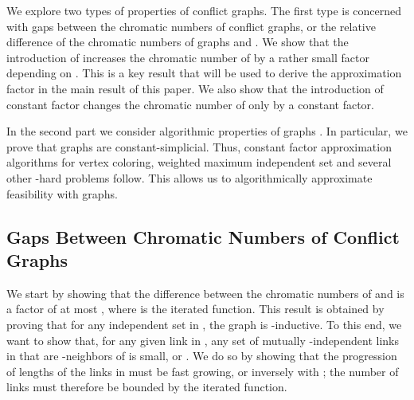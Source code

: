 \documentclass[11pt]{article}
\newcommand{\subsec}[1]{\subsection{#1}}
\begin{document}
We explore two types of properties of conflict graphs. The first type is concerned with gaps between the chromatic numbers of conflict graphs, or the relative difference of the chromatic numbers of graphs  and .
We show that the introduction of  increases the chromatic number of  by a rather small factor depending on . This is a key result that will be used to derive the approximation factor in the main result of this paper. 
We also show that the introduction of constant factor  changes the chromatic number of  only by a constant factor.

 In the second part we consider algorithmic properties of graphs . In particular, we prove that graphs  are constant-simplicial. Thus, constant factor approximation algorithms for vertex coloring, weighted maximum independent set and several other -hard problems follow. This allows us to algorithmically approximate feasibility with graphs.


\subsec{Gaps Between Chromatic Numbers of Conflict Graphs}\label{S:gaps}
We start by  showing that the difference between the chromatic numbers of  and  is a factor of at most , where  is the iterated  function. This result is obtained by proving that for any independent set  in , the graph  is -inductive. 
To this end, we want to show that, for any given link  in , any set  of mutually -independent links in
  that are -neighbors of  is small, or . We do so by showing that the progression of
 lengths of the links in  must be fast growing, or inversely with ; the number of links must therefore be bounded
 by the iterated  function.
\end{document}
